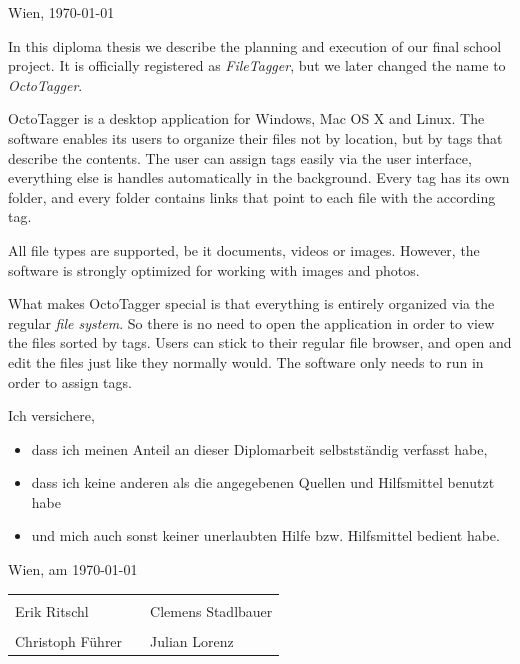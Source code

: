 \documentclass[12pt,a4paper,english,oneside,openright,DIV=12,BCOR=1cm]{scrbook}
\begin{document}
\begin{titlepage}
\begin{center}
\vspace{5mm}
Wien, \today
\par\end{center}

\end{titlepage}%


\thispagestyle{fancy}
In this diploma thesis we describe the planning and execution of our final
school project. It is officially registered as \textit{FileTagger}, but we later changed the name to \textit{OctoTagger}.

OctoTagger is a desktop application for Windows, Mac OS X and Linux. The
software enables its users to organize their files not by location, but by tags
that describe the contents. The user can assign tags easily via the user
interface, everything else is handles automatically in the background. Every tag has its own folder, and every folder contains links that point to each file with
the according tag.

All file types are supported, be it documents, videos or images. However,
the software is strongly optimized for working with images and photos.

What makes OctoTagger special is that everything is entirely organized via the regular \emph{file system}. So there is no need to open the
application in order to view the files sorted by tags. Users can stick to their regular file browser, and open and edit the files just like they normally would. The software only needs to run in order to assign tags.


\thispagestyle{fancy}

Ich versichere,
\begin{itemize}
\item dass ich meinen Anteil an dieser Diplomarbeit selbstständig verfasst
habe,
\item dass ich keine anderen als die angegebenen Quellen und Hilfsmittel
benutzt habe
\item und mich auch sonst keiner unerlaubten Hilfe bzw. Hilfsmittel bedient
habe.
\end{itemize}
\bigskip{}
Wien, am \today %

\vfill
\noindent\begin{tabular}{p{.45\linewidth}p{.1\linewidth}p{.45\linewidth}}
	\dotfill & & \dotfill \\
	Erik Ritschl & & Clemens Stadlbauer \\[16ex]
	\dotfill & & \dotfill \\
	Christoph Führer & & Julian Lorenz
\end{tabular}
\vfill
\end{document}
